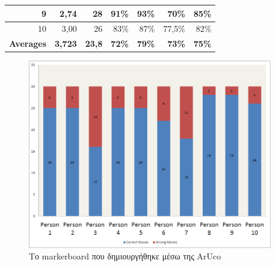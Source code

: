\begin{table}[h]
\begin{tabular}{|r|r|r|r|r|r|r|}
9                                                                                      & 2,74                                                                                                  & 28                                                                                                 & 91\%                               & 93\%                                & 70\%                                     & 85\%                               \\ \hline
10                                                                                     & 3,00                                                                                                  & 26                                                                                                 & 83\%                               & 87\%                                & 77,5\%                                   & 82\%                               \\ \hline
{\bf Averages}                                                                         & {\bf 3,723}                                                                                           & {\bf 23,8}                                                                                         & {\bf 72\%}                         & {\bf 79\%}                          & {\bf 73\%}                               & {\bf 75\%}                         \\ \hline
\end{tabular}
\end{table}





\begin{figure}[H]
    \centering
    \includegraphics[width=0.95\textwidth]{Files/Figures/correctmoves.png}
    \caption[Το markerboard που δημιουργήθηκε μέσω της ArUco]{Το markerboard που δημιουργήθηκε μέσω της ArUco}
    \label{fig:markerboard}
\end{figure}



